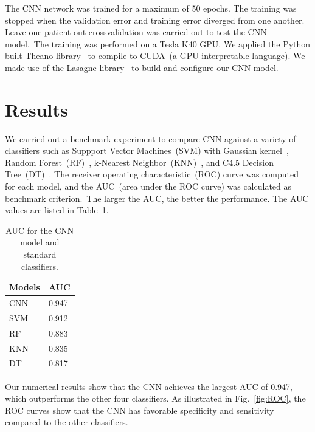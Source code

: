 \documentclass{article}
\begin{document}
The CNN network was trained for a maximum of 50 epochs. The training was stopped when the validation error and training error diverged from one another.
Leave-one-patient-out crossvalidation was carried out to test the CNN model.~The training was performed on a Tesla K40 GPU. We applied the Python built Theano library~\cite{bergstra+al:2010-scipy,Bastien-Theano-2012} to compile to CUDA~(a GPU interpretable language). We made use of the Lasagne library~\cite{sander_dieleman_2015_27878} to build and configure our CNN model.

\section{Results}
\label{sec:Benchmark}

We carried out a benchmark experiment to compare CNN against a variety of classifiers such as Suppport Vector Machines~(SVM) with Gaussian kernel~\cite{hearst1998support}, Random Forest~(RF)~\cite{svetnik2003random}, k-Nearest Neighbor~(KNN)~\cite{peterson2009k}, and C4.5 Decision Tree~(DT)~\cite{quinlan1986induction}.
The receiver operating characteristic~(ROC) curve was computed for each model, and the AUC~(area under the ROC curve) was calculated as benchmark criterion.~The larger the AUC, the better the performance. The AUC values are listed in Table~\ref{tab:AUC}.

\begin{table}[htb]
    \centering

    \begin{tabular}{|l|l|}
    \hline
    Models & AUC    \\ \hline
    CNN    & 0.947 \\
    SVM    & 0.912 \\
    RF     & 0.883 \\
    KNN    & 0.835 \\
    DT     & 0.817 \\ \hline
    \end{tabular}

    \caption{AUC for the CNN model and standard classifiers.}
    \label{tab:AUC}

\end{table}

Our numerical results show that the CNN achieves the largest AUC of 0.947, which outperforms the other four classifiers. As illustrated in Fig.~\ref{fig:ROC}, the ROC curves show that the CNN has favorable specificity and sensitivity compared to the other classifiers.
\end{document}
